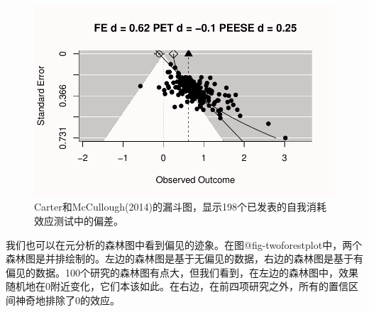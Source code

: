 \documentclass[
  letterpaper,
  DIV=11,
  numbers=noendperiod]{scrreprt}
\begin{document}
\begin{figure}

{\centering \includegraphics[width=1\textwidth,height=\textheight]{12-bias_files/figure-pdf/fig-carterbias-1.pdf}

}

\caption{\label{fig-carterbias}Carter和McCullough(2014)的漏斗图，显示198个已发表的自我消耗效应测试中的偏差。}

\end{figure}

我们也可以在元分析的森林图中看到偏见的迹象。在图@fig-twoforestplot中，两个森林图是并排绘制的。左边的森林图是基于无偏见的数据，右边的森林图是基于有偏见的数据。100个研究的森林图有点大，但我们看到，在左边的森林图中，效果随机地在0附近变化，它们本该如此。在右边，在前四项研究之外，所有的置信区间神奇地排除了0的效应。
\end{document}
